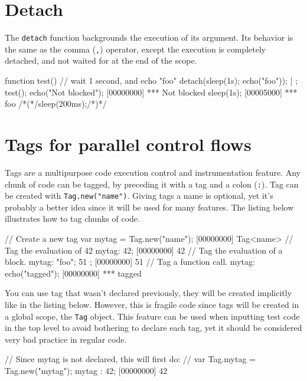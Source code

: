 \section{Detach}

The \lstinline{detach} function backgrounds the execution of its
argument. Its behavior is the same as the comma (\lstinline{,}) operator,
except the execution is completely detached, and not waited for at the
end of the scope.

\begin{urbiscript}
function test()
{
  // wait 1 second, and echo "foo"
  detach({sleep(1s); echo("foo")});
} | {};
test();
echo("Not blocked");
[00000000] *** Not blocked
sleep(1s);
[00005000] *** foo
/*(*/sleep(200ms);/*)*/
\end{urbiscript}

\section{Tags for parallel control flows}
\label{sec:tut:tags}

Tags are a multipurpose code execution control and instrumentation
feature. Any chunk of code can be tagged, by preceding it with a tag
and a colon (\lstinline{:}). Tag can be created with
\lstinline|Tag.new("name")|. Giving tags a name is optional, yet it's
probably a better idea since it will be used for many
features. The listing below illustrates how to tag chunks of code.

\begin{urbiscript}
// Create a new tag
var mytag = Tag.new("name");
[00000000] Tag<name>
// Tag the evaluation of 42
mytag: 42;
[00000000] 42
// Tag the evaluation of a block.
mytag: { "foo"; 51 };
[00000000] 51
// Tag a function call.
mytag: echo("tagged");
[00000000] *** tagged
\end{urbiscript}

You can use tag that wasn't declared previously, they will be created
implicitly like in the listing below. However, this is fragile code since
tags will be created in a global scope, the \lstinline{Tag} object. This
feature can be used when inputting test code in the top level to avoid
bothering to declare each tag, yet it should be considered very bad
practice in regular code.

\begin{urbiscript}
// Since mytag is not declared, this will first do:
// var Tag.mytag = Tag.new("mytag");
mytag : 42;
[00000000] 42
\end{urbiscript}

